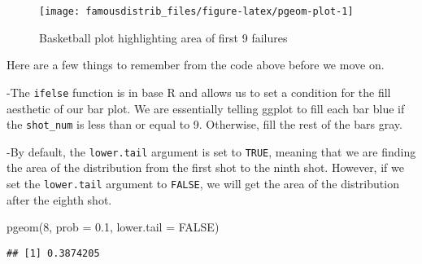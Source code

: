 \documentclass[
]{article}
\newenvironment{Shaded}{\begin{snugshade}}{\end{snugshade}}
\newcommand{\AttributeTok}[1]{\textcolor[rgb]{0.77,0.63,0.00}{#1}}
\newcommand{\CommentTok}[1]{\textcolor[rgb]{0.56,0.35,0.01}{\textit{#1}}}
\newcommand{\ConstantTok}[1]{\textcolor[rgb]{0.00,0.00,0.00}{#1}}
\newcommand{\DecValTok}[1]{\textcolor[rgb]{0.00,0.00,0.81}{#1}}
\newcommand{\FloatTok}[1]{\textcolor[rgb]{0.00,0.00,0.81}{#1}}
\newcommand{\FunctionTok}[1]{\textcolor[rgb]{0.00,0.00,0.00}{#1}}
\newcommand{\NormalTok}[1]{#1}
\newcommand{\SpecialCharTok}[1]{\textcolor[rgb]{0.00,0.00,0.00}{#1}}
\newcommand{\StringTok}[1]{\textcolor[rgb]{0.31,0.60,0.02}{#1}}
\begin{document}
\begin{figure}

{\centering \texttt{[image: famousdistrib\_files/figure-latex/pgeom-plot-1]} 

}

\caption{Basketball plot highlighting area of first 9 failures}\label{fig:pgeom-plot}
\end{figure}

Here are a few things to remember from the code above before we move on.

-The \texttt{ifelse} function is in base R and allows us to set a condition for the fill aesthetic of our bar plot. We are essentially telling ggplot to fill each bar blue if the \texttt{shot\_num} is less than or equal to 9. Otherwise, fill the rest of the bars gray.

-By default, the \texttt{lower.tail} argument is set to \texttt{TRUE}, meaning that we are finding the area of the distribution from the first shot to the ninth shot. However, if we set the \texttt{lower.tail} argument to \texttt{FALSE}, we will get the area of the distribution after the eighth shot.

\begin{Shaded}
\begin{Highlighting}[]
\FunctionTok{pgeom}\NormalTok{(}\DecValTok{8}\NormalTok{, }\AttributeTok{prob =} \FloatTok{0.1}\NormalTok{, }\AttributeTok{lower.tail =} \ConstantTok{FALSE}\NormalTok{)}
\end{Highlighting}
\end{Shaded}

\begin{verbatim}
## [1] 0.3874205
\end{verbatim}

\begin{Shaded}
\end{Shaded}
\end{document}
